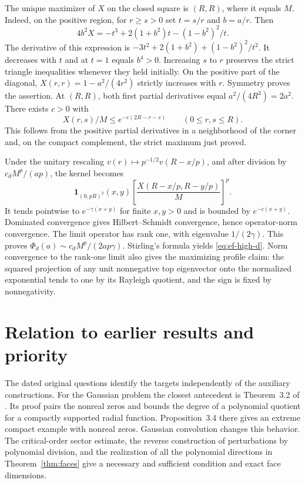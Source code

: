 \documentclass[11pt,a4paper]{article}
\numberwithin{equation}{section}
\begin{document}
The unique maximizer of $X$ on the closed square is $(R,R)$, where it equals $M$. Indeed, on the positive region, for $r\ge s>0$ set $t=s/r$ and $b=a/r$. Then
\[
 4b^2 X=-t^3+2(1+b^2)t-(1-b^2)^2/t.
\]
The derivative of this expression is $-3t^2+2(1+b^2)+(1-b^2)^2/t^2$. It decreases with $t$ and at $t=1$ equals $b^4>0$. Increasing $s$ to $r$ preserves the strict triangle inequalities whenever they held initially. On the positive part of the diagonal, $X(r,r)=1-a^2/(4r^2)$ strictly increases with $r$. Symmetry proves the assertion. At $(R,R)$, both first partial derivatives equal $a^2/(4R^3)=2a^2$. There exists $c>0$ with
\[
 X(r,s)/M\le e^{-c(2R-r-s)}
 \qquad(0\le r,s\le R).
\]
This follows from the positive partial derivatives in a neighborhood of the corner and, on the compact complement, the strict maximum just proved.

Under the unitary rescaling $v(r)\mapsto p^{-1/2}v(R-x/p)$, and after division by $c_dM^p/(ap)$, the kernel becomes
\[
 \mathbf1_{(0,pR)^2}(x,y)\left[\frac{X(R-x/p,R-y/p)}M\right]^p.
\]
It tends pointwise to $e^{-\gamma(x+y)}$ for finite $x,y>0$ and is bounded by $e^{-c(x+y)}$. Dominated convergence gives Hilbert--Schmidt convergence, hence operator-norm convergence. The limit operator has rank one, with eigenvalue $1/(2\gamma)$. This proves $\Phi_d(a)\sim c_d M^p/(2a p\gamma)$. Stirling's formula yields \eqref{eq:ef-high-d}. Norm convergence to the rank-one limit also gives the maximizing profile claim: the squared projection of any unit nonnegative top eigenvector onto the normalized exponential tends to one by its Rayleigh quotient, and the sign is fixed by nonnegativity.

\section*{Relation to earlier results and priority}
The dated original questions identify the targets independently of the auxiliary constructions. For the Gaussian problem the closest antecedent is Theorem~3.2 of \cite{JMR2009}. Its proof pairs the nonreal zeros and bounds the degree of a polynomial quotient for a compactly supported radial function. Proposition~3.4 there gives an extreme compact example with nonreal zeros. Gaussian convolution changes this behavior. The critical-order sector estimate, the reverse construction of perturbations by polynomial division, and the realization of all the polynomial directions in Theorem~\ref{thm:faces} give a necessary and sufficient condition and exact face dimensions.
\end{document}
